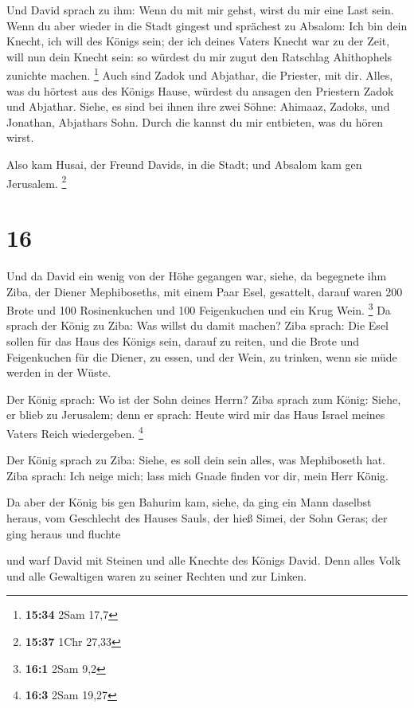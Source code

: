  Und David sprach zu ihm: Wenn du mit mir gehst, wirst du
mir eine Last sein.  Wenn du aber wieder in die Stadt
gingest und sprächest zu Absalom: Ich bin dein Knecht, ich will des
Königs sein; der ich deines Vaters Knecht war zu der Zeit, will nun dein
Knecht sein: so würdest du mir zugut den Ratschlag Ahithophels zunichte
machen. \footnote{\textbf{15:34} 2Sam 17,7}  Auch sind
Zadok und Abjathar, die Priester, mit dir. Alles, was du hörtest aus des
Königs Hause, würdest du ansagen den Priestern Zadok und Abjathar.
 Siehe, es sind bei ihnen ihre zwei Söhne: Ahimaaz, Zadoks,
und Jonathan, Abjathars Sohn. Durch die kannst du mir entbieten, was du
hören wirst.

 Also kam Husai, der Freund Davids, in die Stadt; und
Absalom kam gen Jerusalem. \footnote{\textbf{15:37} 1Chr 27,33}

\hypertarget{section-2}{%
\section{16}\label{section-2}}

 Und da David ein wenig von der Höhe gegangen war, siehe, da
begegnete ihm Ziba, der Diener Mephiboseths, mit einem Paar Esel,
gesattelt, darauf waren 200 Brote und 100 Rosinenkuchen und 100
Feigenkuchen und ein Krug Wein. \footnote{\textbf{16:1} 2Sam 9,2}
 Da sprach der König zu Ziba: Was willst du damit machen?
Ziba sprach: Die Esel sollen für das Haus des Königs sein, darauf zu
reiten, und die Brote und Feigenkuchen für die Diener, zu essen, und der
Wein, zu trinken, wenn sie müde werden in der Wüste.

 Der König sprach: Wo ist der Sohn deines Herrn? Ziba sprach
zum König: Siehe, er blieb zu Jerusalem; denn er sprach: Heute wird mir
das Haus Israel meines Vaters Reich wiedergeben. \footnote{\textbf{16:3}
  2Sam 19,27}

 Der König sprach zu Ziba: Siehe, es soll dein sein alles,
was Mephiboseth hat. Ziba sprach: Ich neige mich; lass mich Gnade finden
vor dir, mein Herr König.

 Da aber der König bis gen Bahurim kam, siehe, da ging ein
Mann daselbst heraus, vom Geschlecht des Hauses Sauls, der hieß Simei,
der Sohn Geras; der ging heraus und fluchte

 und warf David mit Steinen und alle Knechte des Königs
David. Denn alles Volk und alle Gewaltigen waren zu seiner Rechten und
zur Linken.

